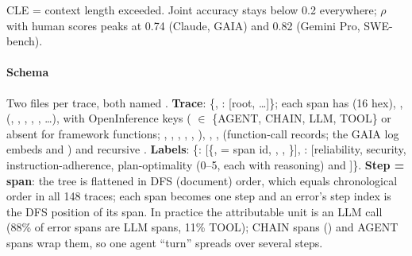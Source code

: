 \begin{center}\small
{}
\end{center}
CLE = context length exceeded. Joint accuracy stays below 0.2 everywhere; $\rho$ with human scores peaks at 0.74 (Claude, GAIA) and 0.82 (Gemini Pro, SWE-bench).

\paragraph{Schema} Two files per trace, both named . \textbf{Trace}: \{, : [root, \ldots]\}; each span has  (16 hex), ,  (, , , , , \ldots),  with OpenInference keys ( $\in$ \{AGENT, CHAIN, LLM, TOOL\} or absent for framework functions; , , , , , ), , ,  (function-call records; the GAIA  log embeds  and ) and recursive . \textbf{Labels}: \{: [\{,  = span id, , , \}], : [reliability, security, instruction-adherence, plan-optimality (0--5, each with reasoning) and ]\}. \textbf{Step = span}: the tree is flattened in DFS (document) order, which equals chronological order in all 148 traces; each span becomes one step and an error's step index is the DFS position of its  span. In practice the attributable unit is an LLM call (88\% of error spans are LLM spans, 11\% TOOL); CHAIN spans () and AGENT spans wrap them, so one agent ``turn'' spreads over several steps.

